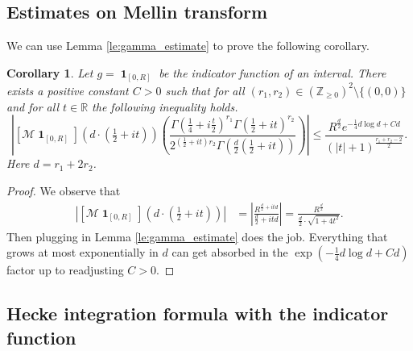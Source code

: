\documentclass[a4paper]{article}
\newtheorem{corollary}[theorem]{Corollary}
\theoremstyle{definition}
\theoremstyle{remark}
\DeclareMathOperator{\ind}{\mathbf{1}}
\newcommand{\mell}[1]{\left[ \mathcal{M} #1 \right] }
\begin{document}
\subsection{Estimates on Mellin transform}
We can use Lemma \ref{le:gamma_estimate}
to prove the following corollary.

\begin{corollary}
\label{co:asymptots_on_mellin}
 Let $g = \ind_{[0,R]}$ be the indicator function of an interval. There exists a positive constant $C>0$ such that for all $(r_{1},r_{2}) \in(\mathbb{Z}_{\geq 0})^{2} \setminus \{(0,0)\}$ and for all $t \in \mathbb{R}$ the following inequality holds.
\begin{equation}
	    \left| 
	    \mell{\ind_{[0,R]}}\left( d \cdot ( \tfrac{1}{2} + it )\right) 
	    \left(\frac{ \Gamma(\tfrac{1}{4} + i \tfrac{t}{2})^{r_{1}} \Gamma({\frac{1}{2} + it})^{r_{2}} }{ 2^{\left({\frac{1}{2} + it}\right) r_{2}}\Gamma \left( \tfrac{d}{2}\left(\frac{1}{2} + it\right)\right)}\right) 
	    \right|
\leq 
\frac{R^{\frac{d}{2}} e^{-\frac{1}{4}d\log d+ C d }}{\left(|t|+ 1 \right)^{\frac{r_{1}+r_{2}-2}{2} }}.
 \end{equation}
 Here $d = r_{1}+2r_{2}$.
\end{corollary}
\begin{proof}
We observe that 
\begin{align}
	\left| \mell{\ind_{[0,R]}}\left( d \cdot (\tfrac{1}{2} + it )\right)\right|
	& =  \left| \frac{ R^{ \frac{d}{2} + i  td } }{ \frac{d}{2} + i t d }\right| =
\frac{R^{\frac{d}{2}}}{ \frac{d}{2} \cdot \sqrt{1 + 4t^{2}}} .
\end{align}
Then plugging in Lemma \ref{le:gamma_estimate} does the job. Everything that grows at most exponentially in $d$ can get absorbed in the ${ \exp ( -  \frac{1}{4} d \log d + C d )}$ factor up to readjusting $C>0$.
\end{proof}

\subsection{Hecke integration formula with the indicator function}

\label{ss:hif_ind}
\end{document}
